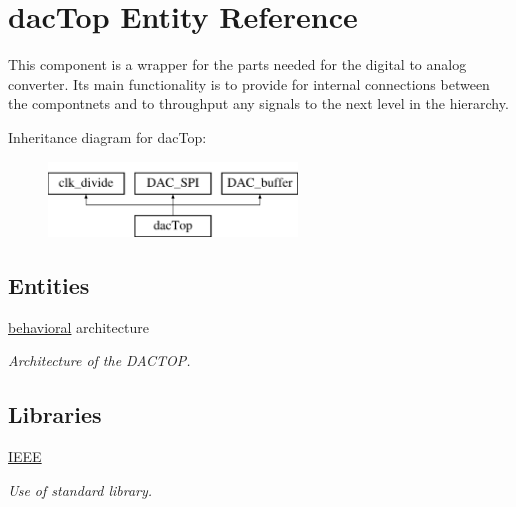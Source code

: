\hypertarget{classdacTop}{\section{dac\-Top Entity Reference}
\label{classdacTop}
}


This component is a wrapper for the parts needed for the digital to analog converter. Its main functionality is to provide for internal connections between the compontnets and to throughput any signals to the next level in the hierarchy.  


Inheritance diagram for dac\-Top\-:\begin{figure}[H]
\begin{center}
\leavevmode
\includegraphics[height=2.000000cm]{classdacTop}
\end{center}
\end{figure}
\subsection*{Entities}
\begin{DoxyCompactItemize}
\item 
\hyperlink{classdacTop_1_1behavioral}{behavioral} architecture
\begin{DoxyCompactList}\small\item\em Architecture of the D\-A\-C\-T\-O\-P. \end{DoxyCompactList}\end{DoxyCompactItemize}
\subsection*{Libraries}
 \begin{DoxyCompactItemize}
\item 
\hypertarget{classdacTop_ae4f03c286607f3181e16b9aa12d0c6d4}{\hyperlink{classdacTop_ae4f03c286607f3181e16b9aa12d0c6d4}{I\-E\-E\-E} }\label{classdacTop_ae4f03c286607f3181e16b9aa12d0c6d4}

\begin{DoxyCompactList}\small\item\em Use of standard library. \end{DoxyCompactList}\end{DoxyCompactItemize}
